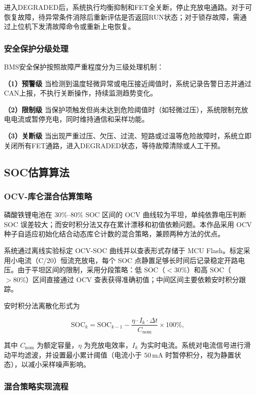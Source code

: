 进入DEGRADED后，系统执行均衡抑制和FET全关断，停止充放电通路。对于可恢复故障，待异常条件消除后重新评估是否返回RUN状态；对于锁存故障，需通过上位机下发清故障命令或重新上电恢复。

\subsubsection{安全保护分级处理}

BMS安全保护按照故障严重程度分为三级处理机制：

\textbf{（1）预警级}
当检测到温度轻微异常或电压接近阈值时，系统记录告警日志并通过CAN上报，不执行关断操作，持续监测趋势变化。

\textbf{（2）限制级}
当保护项触发但尚未达到危险阈值时（如轻微过压），系统限制充放电电流或暂停充电，同时维持通信和采样功能。

\textbf{（3）关断级}
当出现严重过压、欠压、过流、短路或过温等危险故障时，系统立即关闭所有FET通路，进入DEGRADED状态，等待故障清除或人工干预。

\subsection{SOC估算算法}

\subsubsection{OCV-库仑混合估算策略}

磷酸铁锂电池在 $30\%$--$80\%$ SOC 区间的 OCV 曲线较为平坦，单纯依靠电压判断 SOC 误差较大；而安时积分法又存在累计漂移和初值依赖问题。本作品采用 OCV 种子自适应初始化结合动态库仑计数的混合策略，兼顾两种方法的优点。

系统通过离线实验标定 OCV-SOC 曲线并以查表形式存储于 MCU Flash。标定采用小电流（C/20）恒流充放电，每个 SOC 点静置足够长时间后记录稳定开路电压。由于平坦区间的限制，采用分段策略：低 SOC（$<30\%$）和高 SOC（$>80\%$）区间直接通过 OCV 查表获得准确初值；中间区间主要依赖安时积分跟踪。

安时积分法离散化形式为

\[
\mathrm{SOC}_k=\mathrm{SOC}_{k-1}-\frac{\eta\cdot I_k\cdot\Delta t}{C_{\mathrm{nom}}}\times100\%,
\]

其中 $C_{\mathrm{nom}}$ 为额定容量，$\eta$ 为充放电效率，$I_k$ 为实时电流。系统对电流信号进行滑动平均滤波，并设置最小累计阈值（电流小于 $50\,\mathrm{mA}$ 时暂停积分，视为静置状态），以减小采样噪声影响。

\subsubsection{混合策略实现流程}

